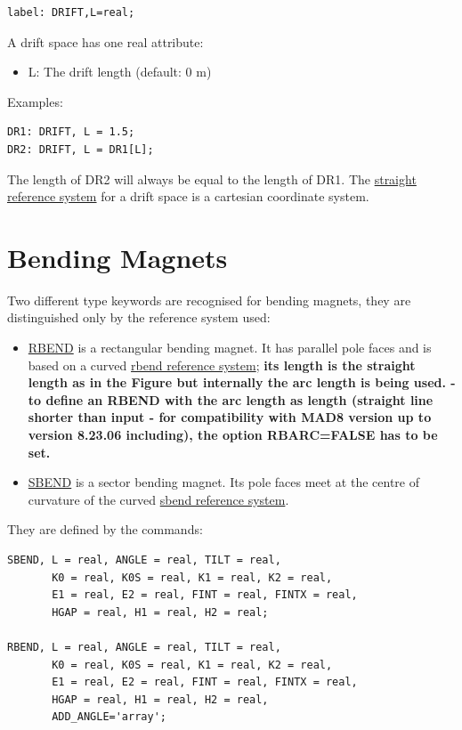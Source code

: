 \begin{verbatim}
label: DRIFT,L=real;
\end{verbatim} 

A drift space has one real attribute: 
\begin{itemize}
   \item L: The drift length (default: 0 m) 
\end{itemize} 

Examples: 
\begin{verbatim}
DR1: DRIFT, L = 1.5;
DR2: DRIFT, L = DR1[L];
\end{verbatim} 

The length of DR2 will always be equal to the length of DR1. The
\href{../Introduction/local_system.html#straight}{straight reference
  system} for a drift space is a cartesian coordinate system.  


%
\section{Bending Magnets}
\label{sec:bend}
Two different type keywords are recognised for bending magnets, they are
distinguished only by the reference system used:  
\begin{itemize}
   \item \href{rbend}{RBEND} \label{bend_rbend} is a rectangular bending magnet. It has
     parallel pole faces and is based on a curved
     \href{local_system.html#rbend}{rbend reference system};  \textbf{
       its length is the straight length as in the Figure but internally
       the arc length is being used.  - to define an RBEND with the arc
       length as length (straight line shorter than input - for
       compatibility with MAD8 version up to version 8.23.06 including),
       the option RBARC=FALSE has to be set.} 
   \item \href{sbend}{SBEND} is a sector bending magnet. Its pole faces
     meet at the centre of curvature of the curved
     \href{local_system.html#sbend}{sbend reference system}.  
\end{itemize} 

They are defined by the commands: 
\begin{verbatim}
SBEND, L = real, ANGLE = real, TILT = real, 
       K0 = real, K0S = real, K1 = real, K2 = real, 
       E1 = real, E2 = real, FINT = real, FINTX = real, 
       HGAP = real, H1 = real, H2 = real;

RBEND, L = real, ANGLE = real, TILT = real, 
       K0 = real, K0S = real, K1 = real, K2 = real, 
       E1 = real, E2 = real, FINT = real, FINTX = real,
       HGAP = real, H1 = real, H2 = real,
       ADD_ANGLE='array';
\end{verbatim} 

